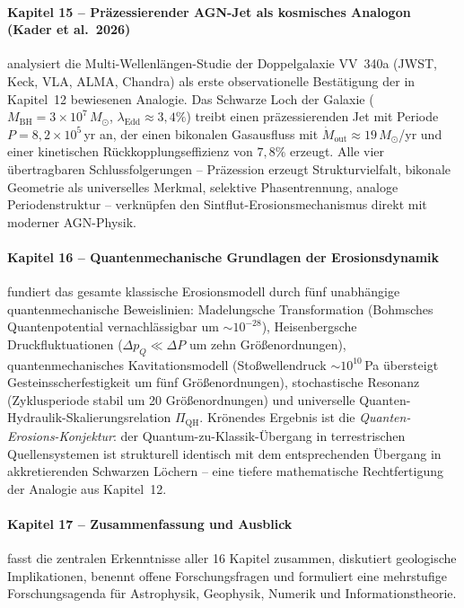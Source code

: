 ﻿\documentclass[12pt,a4paper]{report}
\begin{document}
\paragraph{Kapitel 15 -- Präzessierender AGN-Jet als kosmisches Analogon (Kader et al.\ 2026)}
analysiert die Multi-Wellenlängen-Studie der Doppelgalaxie VV~340a (JWST, Keck, VLA, ALMA, Chandra) als erste observationelle Bestätigung der in Kapitel~12 bewiesenen Analogie. Das Schwarze Loch der Galaxie ($M_\mathrm{BH} = 3\times10^7\,M_\odot$, $\lambda_\mathrm{Edd} \approx 3{,}4\%$) treibt einen präzessierenden Jet mit Periode $P = 8{,}2 \times 10^5$\,yr an, der einen bikonalen Gasausfluss mit $\dot{M}_\mathrm{out} \approx 19\,M_\odot$/yr und einer kinetischen Rückkopplungseffizienz von $7{,}8\%$ erzeugt. Alle vier übertragbaren Schlussfolgerungen -- Präzession erzeugt Strukturvielfalt, bikonale Geometrie als universelles Merkmal, selektive Phasentrennung, analoge Periodenstruktur -- verknüpfen den Sintflut-Erosionsmechanismus direkt mit moderner AGN-Physik.

\paragraph{Kapitel 16 -- Quantenmechanische Grundlagen der Erosionsdynamik}
fundiert das gesamte klassische Erosionsmodell durch fünf unabhängige quantenmechanische Beweislinien: Madelungsche Transformation (Bohmsches Quantenpotential vernachlässigbar um $\sim10^{-28}$), Heisenbergsche Druckfluktuationen ($\Delta p_Q \ll \Delta P$ um zehn Größenordnungen), quantenmechanisches Kavitationsmodell (Stoßwellendruck $\sim10^{10}$\,Pa übersteigt Gesteinsscherfestigkeit um fünf Größenordnungen), stochastische Resonanz (Zyklusperiode stabil um 20 Größenordnungen) und universelle Quanten-Hydraulik-Skalierungsrelation $\Pi_\mathrm{QH}$. Krönendes Ergebnis ist die \textit{Quanten-Erosions-Konjektur}: der Quantum-zu-Klassik-Übergang in terrestrischen Quellensystemen ist strukturell identisch mit dem entsprechenden Übergang in akkretierenden Schwarzen Löchern -- eine tiefere mathematische Rechtfertigung der Analogie aus Kapitel~12.

\paragraph{Kapitel 17 -- Zusammenfassung und Ausblick}
fasst die zentralen Erkenntnisse aller 16 Kapitel zusammen, diskutiert geologische Implikationen, benennt offene Forschungsfragen und formuliert eine mehrstufige Forschungsagenda für Astrophysik, Geophysik, Numerik und Informationstheorie.
\end{document}

